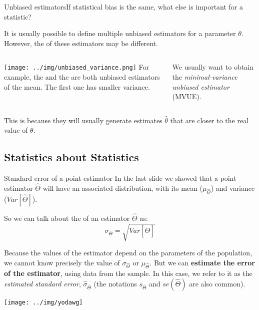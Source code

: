 \begin{frame}{Unbiased estimators}{If statistical bias is the same, what else is important for a statistic?}

It is usually possible to define multiple unbiased estimators for a parameter $\theta$. However, the  of these estimators may be different.\bigskip

\begin{columns}[T]
    \texttt{[image: ../img/unbiased\_variance.png]}
    For example, the  and the  are both unbiased estimators of the mean. The first one has smaller variance.\bigskip

    We usually want to obtain the \textit{minimal-variance unbiased estimator} (MVUE).
\end{columns}\bigskip
This is because they will usually generate estimates $\hat\theta$ that are closer to the real value of $\theta$.

\end{frame}

\subsection{Statistics about Statistics}
\begin{frame}{Standard error of a point estimator}
In the last slide we showed that a point estimator $\hat\Theta$ will have an associated distribution, with its mean ($\mu_{\hat\Theta}$) and variance ($Var\left[\hat{\Theta}\right]$).\bigskip

So we can talk about the  of an estimator $\hat{\Theta}$ as:
\begin{equation*}
\sigma_{\hat{\Theta}} = \sqrt{Var\left[\hat{\Theta}\right]}
\end{equation*}\bigskip

Because the values of the estimator depend on the parameters of the population, we cannot know precisely the value of $\sigma_{\hat\Theta}$ or $\mu_{\hat\Theta}$. But we can {\bf estimate the error of the estimator}, using data from the sample. In this case, we refer to it as the \textit{estimated standard error}, $\hat{\sigma}_{\hat{\Theta}}$ (the notations $s_{\hat{\Theta}}$ and $se(\hat{\Theta})$ are also common).

\hfill\texttt{[image: ../img/yodawg]}
\end{frame}

